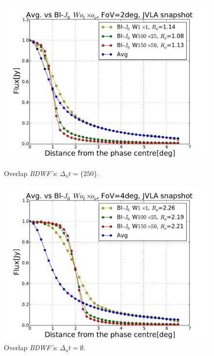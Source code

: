 \documentclass[useAMS,usenatbib]{mn2e}
\begin{document}
\begin{figure}
\begin{minipage}{0.45\linewidth}\includegraphics[width=1\textwidth]{./Figures/Bl-bessel-FoV2-vla.pdf}\caption{Overlap 
		\textit{BDWF's}: $\Delta_u t=\{250\}$.}\label{fig:Bl-bessel-FoV2}\end{minipage}
\begin{minipage}{0.45\linewidth}\includegraphics[width=1\textwidth]{./Figures/Bl-bessel-FoV4-vla.pdf}\caption{
Overlap 
		\textit{BDWF's}: $\Delta_u t=\emptyset$.}\label{fig:fig:Bl-bessel-FoV4}\end{minipage}
\end{figure}
\end{document}
